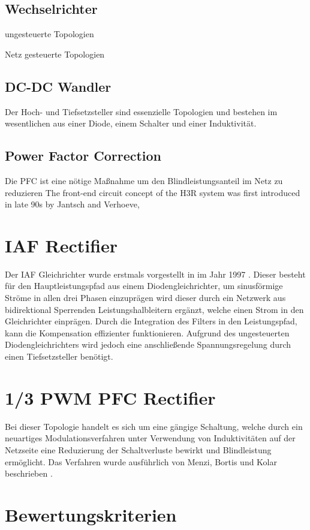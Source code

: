 \subsection{Wechselrichter}

ungesteuerte Topologien

Netz gesteuerte Topologien

\subsection{DC-DC Wandler}
Der Hoch- und Tiefsetzsteller sind essenzielle Topologien und bestehen im wesentlichen aus einer Diode, einem Schalter und einer Induktivität. 
	
\subsection{Power Factor Correction}
	Die \gls{PFC} ist eine nötige Maßnahme um den Blindleistungsanteil im Netz zu reduzieren 
	The front-end circuit concept of the H3R system was first introduced in late 90s by Jantsch and Verhoeve,
	
	
\section{IAF Rectifier}
Der \gls{IAF} Gleichrichter wurde erstmals vorgestellt in \cite{IAFfirst} im Jahr 1997 . Dieser besteht für den Hauptleistungspfad aus einem Diodengleichrichter, um sinusförmige Ströme in allen drei Phasen einzuprägen wird dieser durch ein Netzwerk aus bidirektional Sperrenden Leistungshalbleitern ergänzt, welche einen Strom in den Gleichrichter einprägen. Durch die Integration des Filters in den Leistungspfad, kann die Kompensation effizienter funktionieren. Aufgrund des ungesteuerten Diodengleichrichters wird jedoch eine anschließende Spannungsregelung durch einen Tiefsetzsteller benötigt.

\section{1/3 PWM PFC Rectifier}
Bei dieser Topologie handelt es sich um eine gängige Schaltung, welche durch ein neuartiges Modulationsverfahren unter Verwendung von Induktivitäten auf der Netzseite eine Reduzierung der Schaltverluste bewirkt und Blindleistung ermöglicht. Das Verfahren wurde ausführlich von Menzi, Bortis und Kolar beschrieben \cite{13PWMPFC}.


\section{Bewertungskriterien}

